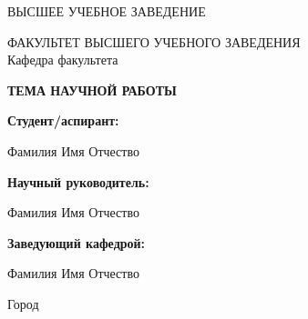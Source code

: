 \begin{titlepage}
	\centering
	\large
	\MakeUppercase{Высшее учебное заведение}

	\vspace{-.8em}\hrulefill

	\normalsize
	\MakeUppercase{Факультет высшего учебного заведения}\\
	Кафедра факультета

	\vspace{4cm}

	\Huge
	{\bf\sf
	\MakeUppercase{Тема научной работы}
	}

	\vspace{4cm}

	\begin{flushright}\large
		\textbf{Студент/аспирант:}

		Фамилия Имя Отчество
		\par\bigskip
		\textbf{Научный руководитель:}

		Фамилия Имя Отчество
		\par\bigskip
		\textbf{Заведующий кафедрой:}

		Фамилия Имя Отчество
	\end{flushright}

	\vspace{\fill}

	\normalsize
	Город

	\number\year

\end{titlepage}
\setcounter{page}{2}